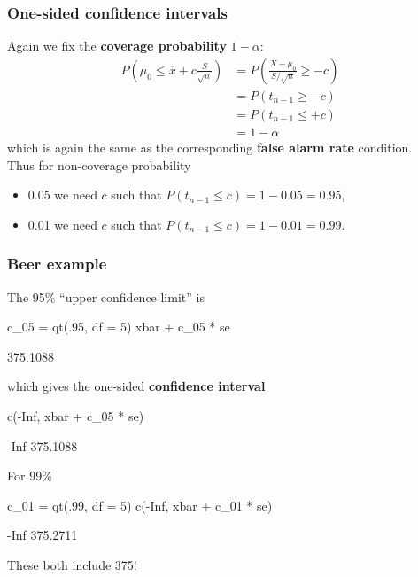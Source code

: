 \documentclass[a4paper]{article}\usepackage[]{graphicx}\usepackage[]{xcolor}
\begin{document}
\subsubsection{One-sided confidence intervals}
Again we fix the \textcolor{myred}{\textbf{coverage probability}} \(  1-\alpha \):
\begin{align*}
	P \left( \mu_0 \leq \overline{x} + c \frac{S}{\sqrt{n}} \right) &= P \left( \frac{\overline{X} - \mu_0}{S / \sqrt{n}} \geq -c \right)\\
	&= P(t_{n-1} \geq -c)\\
	&= P(t_{n-1} \leq +c)\\
	&= 1-\alpha
\end{align*}
which is again the same as the corresponding \textcolor{mygreen}{\textbf{false alarm rate}} condition.\\
Thus for non-coverage probability
\begin{itemize}
	\item 0.05 we need \( c \) such that \( P(t_{n-1} \leq c) = 1-0.05 = 0.95 \),
	\item 0.01 we need \( c \) such that \( P(t_{n-1} \leq c) = 1-0.01 = 0.99 \).
\end{itemize}
\subsubsection{Beer example}
The 95\% ``upper confidence limit'' is
\begin{Schunk}
\begin{Sinput}
c_05 = qt(.95, df = 5)
xbar + c_05 * se
\end{Sinput}
\begin{Soutput}
[1] 375.1088
\end{Soutput}
\end{Schunk}
which gives the one-sided \textcolor{myred}{\textbf{confidence interval}}
\begin{Schunk}
\begin{Sinput}
c(-Inf, xbar + c_05 * se)
\end{Sinput}
\begin{Soutput}
[1]     -Inf 375.1088
\end{Soutput}
\end{Schunk}
For 99\%
\begin{Schunk}
\begin{Sinput}
c_01 = qt(.99, df = 5)
c(-Inf, xbar + c_01 * se)
\end{Sinput}
\begin{Soutput}
[1]     -Inf 375.2711
\end{Soutput}
\end{Schunk}
These both include 375!
\end{document}
